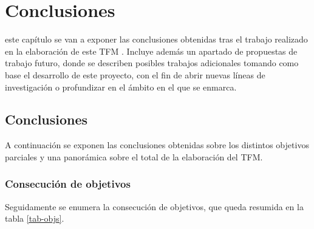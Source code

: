 \chapter{Conclusiones}
\label{chap:conclusiones}
 este capítulo se van a exponer las conclusiones obtenidas tras el trabajo
realizado
en la elaboración de este \acs{TFM} . Incluye además un apartado de propuestas de
trabajo
futuro, donde se describen posibles trabajos adicionales tomando como base el
desarrollo de
este proyecto, con el fin de abrir nuevas líneas de investigación o profundizar
en el ámbito
en el que se enmarca.

\section{Conclusiones}
A continuación se exponen las conclusiones obtenidas sobre los distintos
objetivos parciales y una panorámica sobre el total de la elaboración del
\acs{TFM}.

\subsection{Consecución de objetivos}
Seguidamente se enumera la consecución de objetivos, que queda resumida en la
tabla \ref{tab-objs}.



